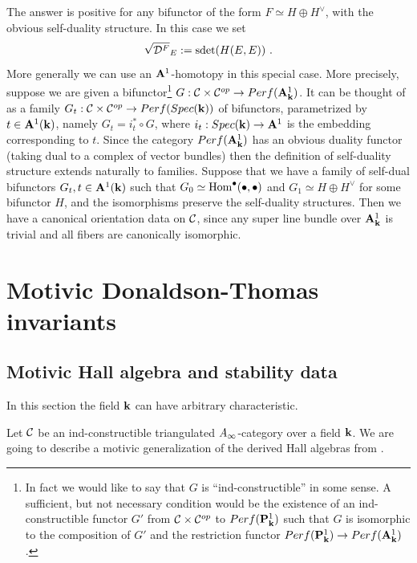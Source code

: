 \documentclass[12pt]{article}
\begin{document}
The answer is positive for any bifunctor of the form $F\simeq H\oplus H^{\vee}$, with the obvious self-duality structure. In this case we set $$\sqrt{{\cal D}^F}_E:=\operatorname{sdet}(H(E,E))\,\,.$$ More generally we can use an ${\bf A}^1$-homotopy in  this special case. More precisely, suppose we are given a bifunctor\footnote{In fact we would like to say that $G$ is ``ind-constructible'' in some sense. A sufficient, but not necessary condition would be
the existence of an ind-constructible functor $G'$ from ${\mathcal C}\times {\mathcal C}^{op}$ to $Perf({\bf P}^1_{{\bf k}})$ such that $G$ is isomorphic to the composition of
 $G'$ and the restriction functor $Perf({\bf P}^1_{{\bf k}})\to Perf({\bf A}^1_{{\bf k}})$.} $G: {\mathcal C}\times {\mathcal C}^{op}\to Perf({\bf A}^1_{{\bf k}})$. It can be thought of as a family $G_t: {\mathcal C}\times {\mathcal C}^{op}\to Perf(Spec({\bf k}))$ of bifunctors, parametrized by $t\in {\bf A}^1({\bf k})$, namely $G_t=i_t^{\ast}\circ G$, where $i_t: Spec({\bf k})\to {\bf A}^1$ is the embedding corresponding to $t$. Since the category $Perf({\bf A}^1_{{\bf k}})$ has an obvious duality functor (taking dual to a complex of vector bundles) then the definition of self-duality structure extends naturally to families. Suppose that we have a family of self-dual bifunctors $G_t, t\in {\bf A}^1({\bf k})$ such that $G_0\simeq \operatorname{Hom}^{\bullet}(\bullet,\bullet)$ and $G_1\simeq H\oplus H^{\vee}$ for some bifunctor $H$, and the isomorphisms preserve the self-duality structures. Then we have a canonical orientation data on ${\mathcal C}$, since any super line bundle over ${\bf A}^1_{{\bf k}}$ is trivial and all fibers are canonically isomorphic.














\section{Motivic Donaldson-Thomas invariants}




\subsection{Motivic Hall algebra and stability data}

In this section the field ${\bf k}$ can have arbitrary characteristic.

Let ${\mathcal C}$ be an
ind-constructible triangulated  $A_{\infty}$-category over a field ${\bf k}$. We are going to describe a motivic generalization
of the derived Hall algebras from \cite{To}. 
\end{document}
